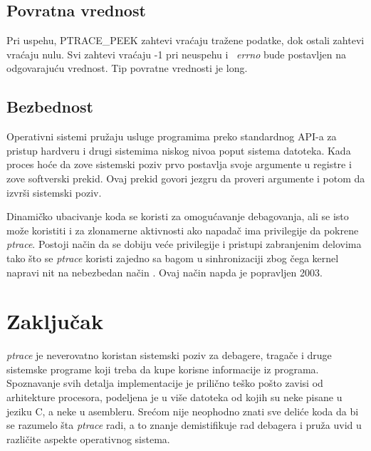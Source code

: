 \documentclass[a4paper]{article}
\begin{document}
\subsection{Povratna vrednost}	
\label{sec:return}

Pri uspehu, PTRACE\_PEEK zahtevi vraćaju tražene podatke, dok ostali zahtevi vraćaju nulu. 
Svi zahtevi vraćaju -1 pri neuspehu i ~\emph{errno} bude postavljen na odgovarajuću vrednost.
Tip povratne vrednosti je long.


\subsection{Bezbednost}	

Operativni sistemi pružaju usluge programima preko standardnog API-a za pristup
hardveru i drugi sistemima niskog nivoa poput sistema datoteka. 
Kada proces hoće da zove sistemski poziv prvo postavlja svoje argumente u registre i 
zove softverski prekid. Ovaj prekid govori jezgru da proveri argumente i potom da
izvrši sistemski poziv.

Dinamičko ubacivanje koda se koristi za omogućavanje debagovanja, ali se isto može koristiti
i za zlonamerne aktivnosti ako napadač ima privilegije da pokrene \emph{ptrace}. 
Postoji način da se dobiju veće privilegije i pristupi zabranjenim delovima tako što se \emph{ptrace} koristi zajedno
sa bagom u sinhronizaciji zbog čega kernel napravi nit na nebezbedan način \cite{hack}. 
Ovaj način napda je popravljen 2003.

\section{Zaključak}

\emph{ptrace} je neverovatno koristan sistemski poziv za debagere, tragače i druge sistemske 
programe koji treba da kupe korisne informacije iz programa. Spoznavanje svih detalja implementacije 
je prilično teško pošto zavisi od arhitekture procesora, podeljena je u više datoteka od kojih su
neke pisane u jeziku C, a neke u asembleru. Srećom nije neophodno znati sve deliće koda da bi
se razumelo šta \emph{ptrace} radi, a to znanje demistifikuje rad debagera i pruža uvid u različite 
aspekte operativnog sistema.

\appendix
 


\appendix
\end{document}
